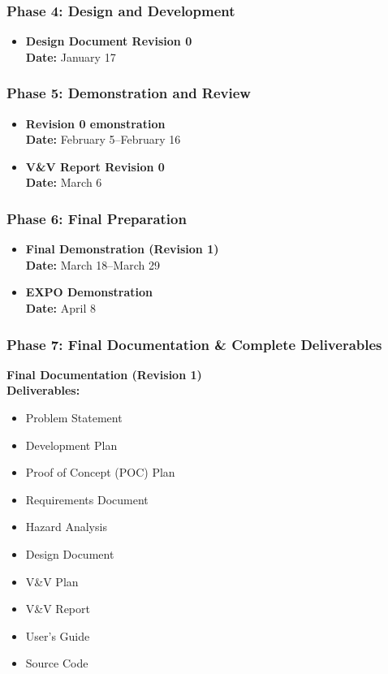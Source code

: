 \documentclass{article}
\begin{document}
\subsubsection*{Phase 4: Design and Development}
\begin{itemize}
    \item \textbf{Design Document Revision 0} \\
    \textbf{Date:} January 17
\end{itemize}

\subsubsection*{Phase 5: Demonstration and Review}
\begin{itemize}
    \item \textbf{Revision 0 emonstration} \\
    \textbf{Date:} February 5–February 16
    \item \textbf{V\&V Report Revision 0} \\
    \textbf{Date:} March 6
\end{itemize}

\subsubsection*{Phase 6: Final Preparation}
\begin{itemize}
    \item \textbf{Final Demonstration (Revision 1)} \\
    \textbf{Date:} March 18–March 29
    \item \textbf{EXPO Demonstration} \\
    \textbf{Date:} April 8
\end{itemize}

\subsubsection*{Phase 7: Final Documentation \& Complete Deliverables}
\textbf{Final Documentation (Revision 1)} \\
\textbf{Deliverables:}
\begin{itemize}
    \item Problem Statement
    \item Development Plan
    \item Proof of Concept (POC) Plan
    \item Requirements Document
    \item Hazard Analysis
    \item Design Document
    \item V\&V Plan
    \item V\&V Report
    \item User’s Guide
    \item Source Code
\end{itemize}
\end{document}
